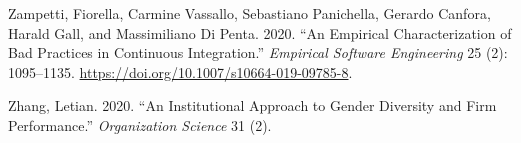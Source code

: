 \documentclass[
]{krantz}
\newlength{\cslhangindent}
\newenvironment{cslreferences}%
  {\setlength{\parindent}{0pt}%
  \everypar{\setlength{\hangindent}{\cslhangindent}}\ignorespaces}%
  {\par}
\begin{document}
\begin{cslreferences}
\leavevmode\hypertarget{ref-Zamp2020}{}%
Zampetti, Fiorella, Carmine Vassallo, Sebastiano Panichella, Gerardo Canfora, Harald Gall, and Massimiliano Di Penta. 2020. ``An Empirical Characterization of Bad Practices in Continuous Integration.'' \emph{Empirical Software Engineering} 25 (2): 1095--1135. \url{https://doi.org/10.1007/s10664-019-09785-8}.

\leavevmode\hypertarget{ref-Zhan2020}{}%
Zhang, Letian. 2020. ``An Institutional Approach to Gender Diversity and Firm Performance.'' \emph{Organization Science} 31 (2).
\end{cslreferences}

\backmatter
\printindex
\end{document}
